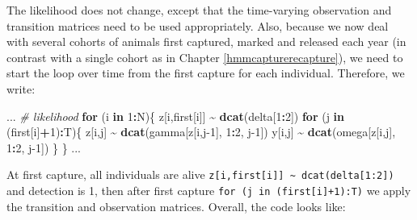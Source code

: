 \documentclass[
  12pt,
]{krantz}
\newenvironment{Shaded}{\begin{snugshade}}{\end{snugshade}}
\newcommand{\CommentTok}[1]{\textcolor[rgb]{0.56,0.35,0.01}{\textit{#1}}}
\newcommand{\ControlFlowTok}[1]{\textcolor[rgb]{0.13,0.29,0.53}{\textbf{#1}}}
\newcommand{\DecValTok}[1]{\textcolor[rgb]{0.00,0.00,0.81}{#1}}
\newcommand{\FunctionTok}[1]{\textcolor[rgb]{0.13,0.29,0.53}{\textbf{#1}}}
\newcommand{\NormalTok}[1]{#1}
\newcommand{\SpecialCharTok}[1]{\textcolor[rgb]{0.81,0.36,0.00}{\textbf{#1}}}
\begin{document}
The likelihood does not change, except that the time-varying observation and transition matrices need to be used appropriately. Also, because we now deal with several cohorts of animals first captured, marked and released each year (in contrast with a single cohort as in Chapter \ref{hmmcapturerecapture}), we need to start the loop over time from the first capture for each individual. Therefore, we write:

\begin{Shaded}
\begin{Highlighting}[]
\NormalTok{...}
\CommentTok{\# likelihood}
  \ControlFlowTok{for}\NormalTok{ (i }\ControlFlowTok{in} \DecValTok{1}\SpecialCharTok{:}\NormalTok{N)\{}
\NormalTok{    z[i,first[i]] }\SpecialCharTok{\textasciitilde{}} \FunctionTok{dcat}\NormalTok{(delta[}\DecValTok{1}\SpecialCharTok{:}\DecValTok{2}\NormalTok{])}
    \ControlFlowTok{for}\NormalTok{ (j }\ControlFlowTok{in}\NormalTok{ (first[i]}\SpecialCharTok{+}\DecValTok{1}\NormalTok{)}\SpecialCharTok{:}\NormalTok{T)\{}
\NormalTok{      z[i,j] }\SpecialCharTok{\textasciitilde{}} \FunctionTok{dcat}\NormalTok{(gamma[z[i,j}\DecValTok{{-}1}\NormalTok{], }\DecValTok{1}\SpecialCharTok{:}\DecValTok{2}\NormalTok{, j}\DecValTok{{-}1}\NormalTok{])}
\NormalTok{      y[i,j] }\SpecialCharTok{\textasciitilde{}} \FunctionTok{dcat}\NormalTok{(omega[z[i,j], }\DecValTok{1}\SpecialCharTok{:}\DecValTok{2}\NormalTok{, j}\DecValTok{{-}1}\NormalTok{])}
\NormalTok{    \}}
\NormalTok{  \}}
\NormalTok{...}
\end{Highlighting}
\end{Shaded}

At first capture, all individuals are alive \texttt{z{[}i,first{[}i{]}{]}\ \textasciitilde{}\ dcat(delta{[}1:2{]})} and detection is 1, then after first capture \texttt{for\ (j\ in\ (first{[}i{]}+1):T)} we apply the transition and observation matrices.
Overall, the code looks like:
\end{document}
